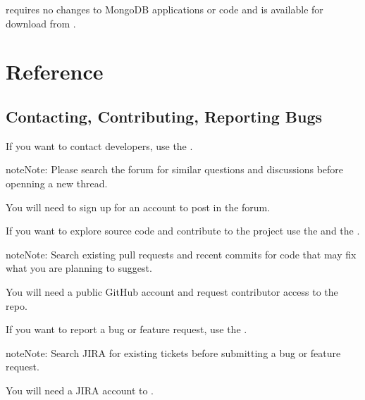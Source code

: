 \documentclass[letterpaper,10pt,english]{sphinxmanual}
\begin{document}
\sphinxAtStartPar
{} requires no changes to MongoDB applications or code and is available for download from .


\part{Reference}
\label{\detokenize{index:reference}}

\chapter{Contacting, Contributing, Reporting Bugs}
\label{\detokenize{contact:contacting-contributing-reporting-bugs}}\label{\detokenize{contact:contact}}\label{\detokenize{contact::doc}}
\sphinxAtStartPar
If you want to contact developers,
use the .

\begin{sphinxadmonition}{note}{Note:}
\sphinxAtStartPar
Please search the forum for similar questions and discussions
before openning a new thread.

\sphinxAtStartPar
You will need to sign up for an account to post in the forum.
\end{sphinxadmonition}

\sphinxAtStartPar
If you want to explore source code and contribute to the project
use the  and the .

\begin{sphinxadmonition}{note}{Note:}
\sphinxAtStartPar
Search existing pull requests and recent commits
for code that may fix what you are planning to suggest.

\sphinxAtStartPar
You will need a public GitHub account
and request contributor access to the repo.
\end{sphinxadmonition}

\sphinxAtStartPar
If you want to report a bug or feature request,
use the .

\begin{sphinxadmonition}{note}{Note:}
\sphinxAtStartPar
Search JIRA for existing tickets
before submitting a bug or feature request.

\sphinxAtStartPar
You will need a JIRA account to .
\end{sphinxadmonition}
\end{document}
